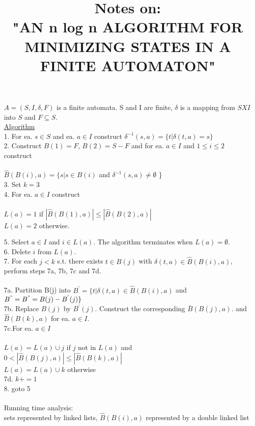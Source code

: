 \documentclass[12pt]{article}
\title{Notes on:\\"AN n log n ALGORITHM FOR MINIMIZING STATES IN A FINITE AUTOMATON"}
\author{}
\date{} %
\begin{document}
\maketitle

$A = (S, I, \delta, F)$ is a finite automata.  S and I are finite, $\delta$ is a mapping from $S X I$ into $S$ and $F \subseteq S$.\\
\underline{Algorithm}\\
1. For ea. $s \in S$ and ea. $a \in I$ construct $\delta^{-1}(s,a) = \{ t | \delta(t,a) = s \}$\\
2. Construct $B(1) = F$, $B(2) = S - F$ and for ea. $a  \in I$ and $1 \le i \le 2$ construct\\
\\ $\hat{B}(B(i), a) = \{ s | s \in B(i)$ and $\delta^{-1}(s,a) \ne \emptyset$   \}\\
3. Set $k = 3$\\
4. For ea. $a \in I$ construct\\
\\  $L(a) = {1}$ if  $| \hat{B}(B(1), a) | \le | \hat{B}(B(2), a) |$\\
 $L(a) = {2}$ otherwise.
 
 \newpage
 
5. Select $a \in I$ and $i \in L(a)$.  The algorithm terminates when $L(a) = \emptyset$.\\
6. Delete $i$ from $L(a)$.\\
7. For each $j < k$ s.t. there exists $t \in B(j)$ with $\delta(t,a) \in \hat{B}(B(i),a)$, perform steps 7a, 7b, 7c and 7d.\\
\\
7a. Partition B(j) into $B^{'} = \{t | \delta(t,a) \in \hat{B}(B(i), a)$ and $B^{"} = B^{"} = B(j) - B^{'}(j) \}$\\ 
7b. Replace $B(j)$ by $B^{'}(j)$. Construct the corresponding $\bar{B}(B(j), a)$. and $\hat{B}(B(k), a)$ for ea. $a \in I$.\\ 
7c.For ea. $a \in I$\\
\\
$L(a) = L(a) \cup {j}$ if $j$ not in $L(a)$ and $0 < | \hat{B}(B(j), a) | \le | \hat{B}(B(k), a) |$\\
$L(a) = L(a) \cup {k}$ otherwise\\
7d. $k+=1$\\
8. goto 5\\
\\
Running time analysis:\\
sets represented by linked lists,
$\hat{B}(B(i), a)$ represented by a double linked list
\end{document}
